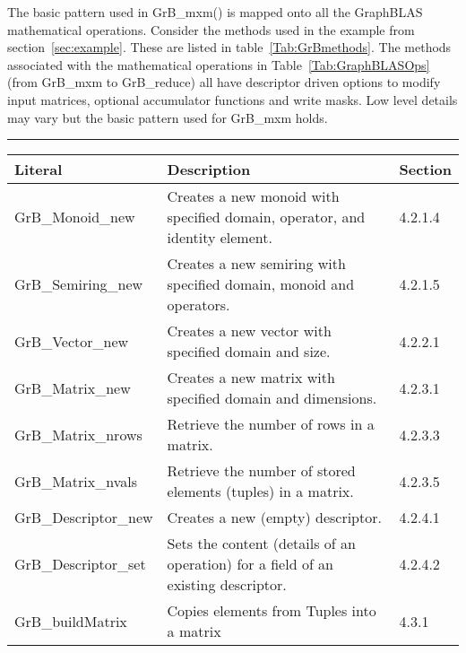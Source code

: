 The basic pattern used in {\sf GrB\_mxm()} is mapped onto all the GraphBLAS mathematical operations.  
Consider the methods used in the example from section~\ref{sec:example}.  These are listed in 
table~\ref{Tab:GrBmethods}.   The methods associated with the mathematical operations in 
Table~\ref{Tab:GraphBLASOps} (from {\sf GrB\_mxm} to {\sf GrB\_reduce})
all have descriptor driven options to modify input matrices, optional accumulator 
functions and write masks.   Low level details may vary but the basic pattern used
for {\sf GrB\_mxm} holds.
 
\begin{table*}[h]
\hrule
\begin{center}
\caption{The following methods are used in the Betweenness Centrality example in section~\ref{sec:example}.  The third 
column in this table refers to the section in the GraphBLAS C specification 1.0 where the method is more fully defined.}
\label{Tab:GrBmethods}
\begin{tabular}{lll}
Literal                 & Description  & Section \\
\hline
	{\sf GrB\_Monoid\_new}      & Creates a new monoid with specified domain, operator, and identity element. &  4.2.1.4 \\
	{\sf GrB\_Semiring\_new}    & Creates a new semiring with specified domain, monoid and operators.           & 4.2.1.5 \\
	{\sf GrB\_Vector\_new}      & Creates a new vector with specified domain and size.                                      & 4.2.2.1 \\
	{\sf GrB\_Matrix\_new}      & Creates a new matrix with specified domain and dimensions.                         &  4.2.3.1 \\
	{\sf GrB\_Matrix\_nrows}    & Retrieve the number of rows in a matrix.                                                          &  4.2.3.3 \\
	{\sf GrB\_Matrix\_nvals}    & Retrieve the number of stored elements (tuples) in a matrix.                            & 4.2.3.5 \\
	{\sf GrB\_Descriptor\_new}  & Creates a new (empty) descriptor.                                                                    &  4.2.4.1 \\
	{\sf GrB\_Descriptor\_set}  & Sets the content (details of an operation) for a field of an existing descriptor.  &  4.2.4.2 \\
	{\sf GrB\_buildMatrix}      & Copies elements from Tuples into a matrix                                                       &  4.3.1 \\

\end{tabular}
\end{center}
\end{table*}
